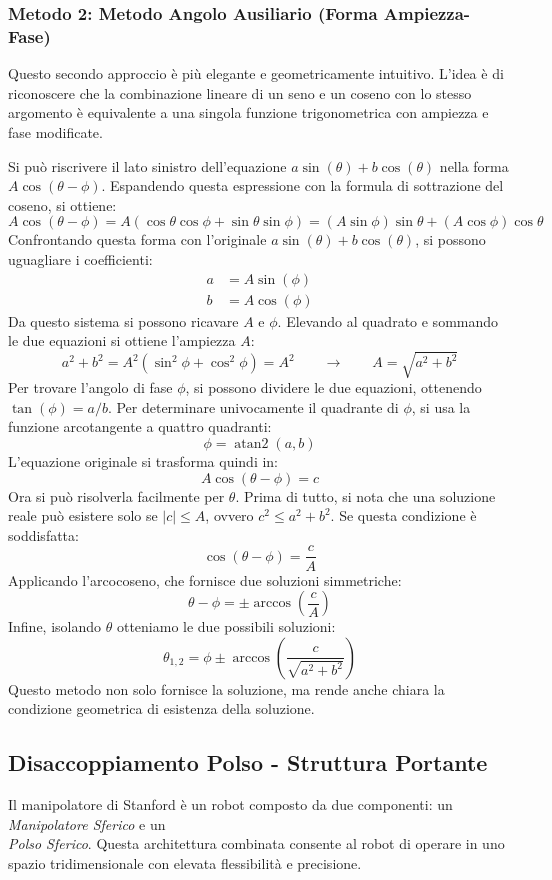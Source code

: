﻿\documentclass[11pt, a4paper]{article}
\begin{document}
\newpage
\subsubsection*{Metodo 2: Metodo Angolo Ausiliario (Forma Ampiezza-Fase)}

Questo secondo approccio è più elegante e geometricamente intuitivo. L'idea è di riconoscere che la combinazione lineare di un seno e un coseno con lo stesso argomento è equivalente a una singola funzione trigonometrica con ampiezza e fase modificate.

Si può riscrivere il lato sinistro dell'equazione \( a \sin(\theta) + b \cos(\theta) \) nella forma \( A \cos(\theta - \phi) \). Espandendo questa espressione con la formula di sottrazione del coseno, si ottiene:
\[
    A \cos(\theta - \phi) = A (\cos\theta \cos\phi + \sin\theta \sin\phi) = (A\sin\phi)\sin\theta + (A\cos\phi)\cos\theta
\]
Confrontando questa forma con l'originale \( a \sin(\theta) + b \cos(\theta) \), si possono uguagliare i coefficienti:
\begin{align*}
    a &= A \sin(\phi) \\
    b &= A \cos(\phi)
\end{align*}
Da questo sistema si possono ricavare \( A \) e \( \phi \). Elevando al quadrato e sommando le due equazioni si ottiene l'ampiezza \( A \):
\[
    a^2 + b^2 = A^2(\sin^2\phi + \cos^2\phi) = A^2 \qquad \longrightarrow \qquad A = \sqrt{a^2 + b^2}
\]
Per trovare l'angolo di fase \( \phi \), si possono dividere le due equazioni, ottenendo \( \tan(\phi) = a/b \). Per determinare univocamente il quadrante di \( \phi \), si usa la funzione arcotangente a quattro quadranti:
\[
    \phi = \operatorname{atan2}(a, b)
\]
L'equazione originale si trasforma quindi in:
\[
    A \cos(\theta - \phi) = c
\]
Ora si può risolverla facilmente per \( \theta \). Prima di tutto, si nota che una soluzione reale può esistere solo se \( |c| \le A \), ovvero \( c^2 \le a^2 + b^2 \). Se questa condizione è soddisfatta:
\[
    \cos(\theta - \phi) = \frac{c}{A}
\]
Applicando l'arcocoseno, che fornisce due soluzioni simmetriche:
\[
    \theta - \phi = \pm \arccos\left(\frac{c}{A}\right)
\]
Infine, isolando \( \theta \) otteniamo le due possibili soluzioni:
\[
    \theta_{1,2} = \phi \pm \arccos\left(\frac{c}{\sqrt{a^2 + b^2}}\right)
\]
Questo metodo non solo fornisce la soluzione, ma rende anche chiara la condizione geometrica di esistenza della soluzione.

\newpage
\subsection{Disaccoppiamento Polso - Struttura Portante}
Il manipolatore di Stanford è un robot composto da due componenti:
un \textit{Manipolatore Sferico} e un \\
\textit{Polso Sferico}. Questa architettura combinata consente al robot di operare in uno spazio tridimensionale con elevata flessibilità e precisione.
\end{document}
